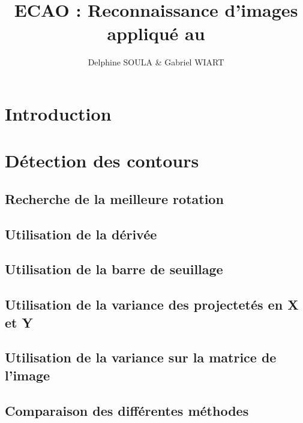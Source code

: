 \documentclass[a4paper,10pt]{article}
\title{ECAO : Reconnaissance d'images appliqué au \rubic}
\author{Delphine SOULA \& Gabriel WIART}
\begin{document}
 \maketitle
\section{Introduction} %


\section{Détection des contours} %


\subsection{Recherche de la meilleure rotation}


\subsection{Utilisation de la dérivée}


\subsection{Utilisation de la barre de seuillage}


\subsection{Utilisation de la variance des projectetés en X et Y} 


\subsection{Utilisation de la variance sur la matrice de l'image} 


\subsection{Comparaison des différentes méthodes}


\end{document}

